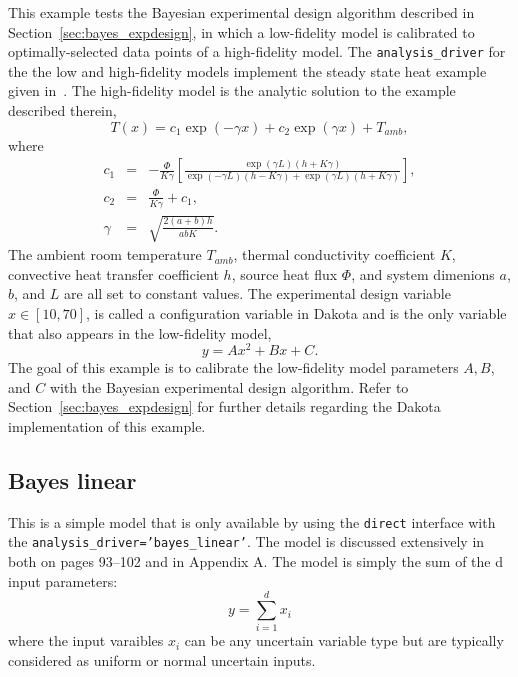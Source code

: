 This example tests the Bayesian experimental design algorithm described in
Section~\ref{sec:bayes_expdesign}, in which a low-fidelity model is calibrated 
to optimally-selected data points of a high-fidelity model. The 
\texttt{analysis\_driver} for the the low and high-fidelity models implement 
the steady state heat example given in~\cite{Lew16}. The high-fidelity model
is the analytic solution to the example described therein,
\begin{equation}
T(x) = c_{1} \exp(-\gamma x) + c_{2} \exp(\gamma x) + T_{amb},
\end{equation}
where
\begin{eqnarray*}
c_{1} &=& - \frac{\Phi}{K \gamma} \left[ \frac{ \exp(\gamma L) (h + K \gamma) }
{\exp(-\gamma L) (h-K\gamma) + \exp(\gamma L) (h+K\gamma)} \right], \\
c_{2} &=& \frac{\Phi}{K\gamma} + c_{1}, \\
\gamma &=& \sqrt{ \frac{ 2(a+b)h }{ abK } }.
\end{eqnarray*}
The ambient room temperature $T_{amb}$, thermal conductivity coefficient $K$, 
convective heat transfer coefficient $h$, source heat flux $\Phi$, and
system dimenions $a$, $b$, and $L$ are all set to constant values. The 
experimental design variable $x \in [10,70]$, is called a configuration variable
in Dakota and is the only variable that also appears in the low-fidelity model,
\begin{equation}
y = A x^2 + B x + C.
\end{equation}
The goal of this example is to calibrate the low-fidelity model parameters
$A, B$, and $C$ with the Bayesian experimental design algorithm. 
Refer to Section~\ref{sec:bayes_expdesign} for further details regarding the
Dakota implementation of this example.

\subsection{Bayes linear}\label{sec:bayes_linear}
This is a simple model that is only available by using the {\tt direct} interface 
with the {\tt analysis\_driver='bayes\_linear'}.  The model is discussed extensively in 
~\cite{CASL2014} both on pages 93--102 and in Appendix A.  The model is simply the 
sum of the d input parameters: 
\begin{equation}
y = \sum\limits_{i=1}^d x_i
\end{equation}
where the input varaibles $x_i$ can be any uncertain variable type but are typically 
considered as uniform or normal uncertain inputs. 
